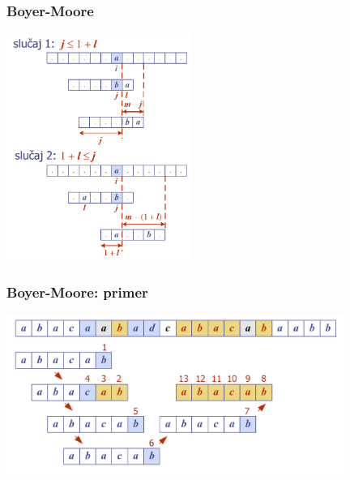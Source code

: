 \documentclass[compress]{beamer}
\begin{document}
\begin{frame}[fragile]
  \frametitle{Boyer-Moore}
  \begin{center}
    \includegraphics[width=6cm]{asp-13-pic02.png}
  \end{center}
\end{frame}

\begin{frame}[fragile]
  \frametitle{Boyer-Moore: primer}
  \begin{center}
    \includegraphics[width=11cm]{asp-13-pic03.png}
  \end{center}
\end{frame}
\end{document}
